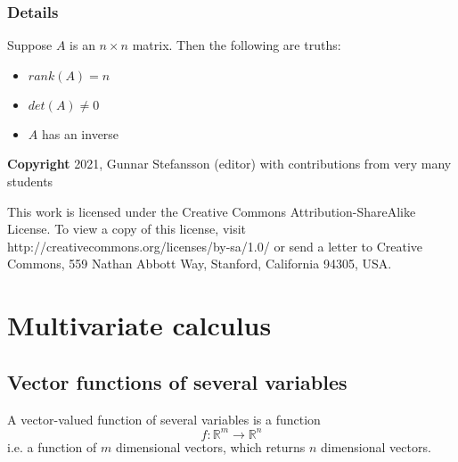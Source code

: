 \documentclass[12pt,a4paper]{article}
\theoremstyle{regla}
\theoremstyle{remark}
\theoremstyle{definition}
\theoremstyle{nonumberbreak}
\begin{document}
\subsubsection{Details}
Suppose $A$ is an $n\times n$ matrix.  Then the following are truths:
\begin{itemize}
\item $rank (A)= n$
\item $det(A)\neq 0$
\item $A$ has an inverse
\end{itemize}

{\bf Copyright}
2021, Gunnar Stefansson (editor) with contributions from very many students

This work is licensed under the Creative Commons
Attribution-ShareAlike License. To view a copy of this license, visit
http://creativecommons.org/licenses/by-sa/1.0/ or send a letter to
Creative Commons, 559 Nathan Abbott Way, Stanford, California 94305,
USA.
\clearpage
\section{Multivariate calculus}
\subsection{Vector functions of several variables}
\begin{fbox}
\begin{minipage}{0.97\textwidth}
A vector-valued function of several variables is a function
$$
f: \mathbb{R}^{m} \rightarrow \mathbb{R}^{n}
$$
i.e. a function of $m$ dimensional vectors, which returns $n$ dimensional vectors.
\end{minipage}
\end{fbox}
\end{document}
